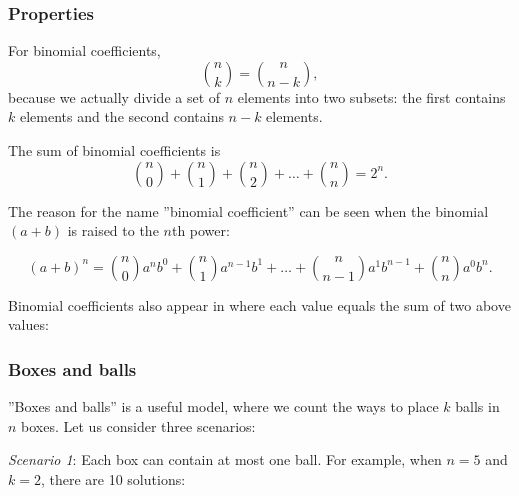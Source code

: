 \subsubsection{Properties}

For binomial coefficients,
\[
    \binom{n}{k}  =  \binom{n}{n-k},
\]
because we actually divide a set of $n$ elements into
two subsets: the first contains $k$ elements
and the second contains $n-k$ elements.

The sum of binomial coefficients is
\[
    \binom{n}{0}+\binom{n}{1}+\binom{n}{2}+\ldots+\binom{n}{n}=2^n.
\]

The reason for the name ''binomial coefficient''
can be seen when the binomial $(a+b)$ is raised to
the $n$th power:

\[ (a+b)^n =
    \binom{n}{0} a^n b^0 +
    \binom{n}{1} a^{n-1} b^1 +
    \ldots +
    \binom{n}{n-1} a^1 b^{n-1} +
    \binom{n}{n} a^0 b^n. \]


Binomial coefficients also appear in
where each value equals the sum of two
above values:
\begin{center}
\end{center}

\subsubsection{Boxes and balls}

''Boxes and balls'' is a useful model,
where we count the ways to
place $k$ balls in $n$ boxes.
Let us consider three scenarios:

\textit{Scenario 1}: Each box can contain
at most one ball.
For example, when $n=5$ and $k=2$,
there are 10 solutions:

